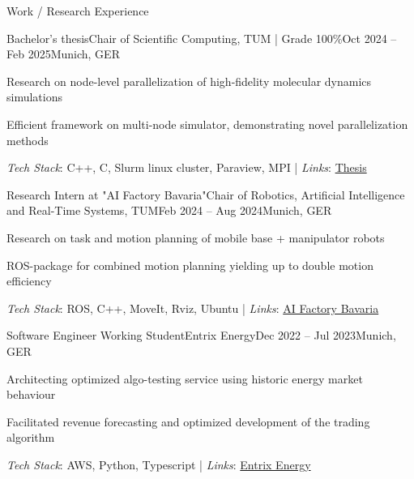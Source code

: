 \documentclass{kyvernitis-resume}
\begin{document}
\begin{section}{Work / Research Experience}

    \begin{subsection}{Bachelor's thesis}{Chair of Scientific Computing, TUM | Grade 100\%}{Oct 2024 -- Feb 2025}{Munich, GER}
    \item{Research on node-level parallelization of high-fidelity molecular dynamics simulations}

    \item{Efficient framework on multi-node simulator, demonstrating novel parallelization methods} 
\end{subsection}
    \textit{Tech Stack}: C++, C, Slurm linux cluster, Paraview, MPI\hspace{0.1cm} | \hspace{0.1cm}
    \textit{Links}: \href{https://mediatum.ub.tum.de/1781358}{Thesis}
    

    \begin{subsection}{Research Intern at "AI Factory Bavaria"}{Chair of Robotics, Artificial Intelligence and Real-Time Systems, TUM}{Feb 2024 -- Aug 2024}{Munich, GER}
    \item Research on task and motion planning of mobile base + manipulator robots
    \item ROS-package for combined motion planning yielding up to double motion efficiency
    \end{subsection}
    \textit{Tech Stack}: ROS, C++, MoveIt, Rviz, Ubuntu\hspace{0.1cm} | \hspace{0.1cm}
    \textit{Links}: \href{https://kifabrik.mirmi.tum.de/}{AI Factory Bavaria}
    

    \begin{subsection}{Software Engineer Working Student}{Entrix Energy}{Dec 2022 -- Jul 2023}{Munich, GER}
        \item Architecting optimized algo-testing service using historic energy market behaviour
        \item Facilitated revenue forecasting and optimized development of the trading algorithm
    \end{subsection}
    \textit{Tech Stack}: AWS, Python, Typescript \hspace{0.1cm} | \hspace{0.1cm}
    \textit{Links}: \href{https://www.entrixenergy.com/en/home/}{Entrix Energy}
    

\end{section}
\end{document}
